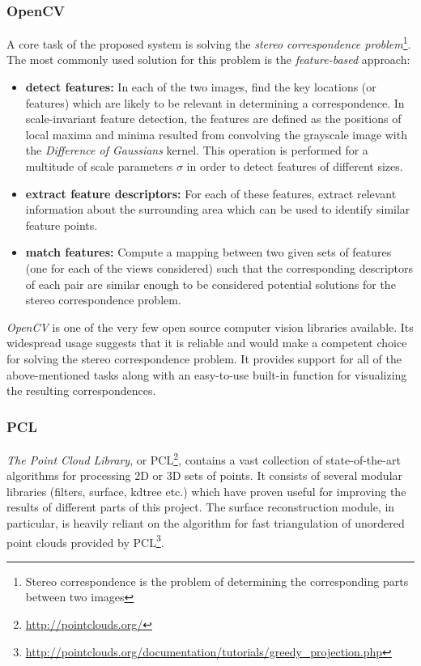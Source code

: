 \documentclass[12pt,a4paper,twoside,openright]{report}
\begin{document}
\subsubsection{OpenCV}
A core task of the proposed system is solving the \emph{stereo correspondence problem}\footnote{Stereo correspondence is the problem of determining the corresponding parts between two images}. The most commonly used solution for this problem is the \emph{feature-based} approach:
\begin{itemize}
\item \textbf{detect features:} In each of the two images, find the key locations (or features) which are likely to be relevant in determining a correspondence. In scale-invariant feature detection, the features are defined as the positions of local maxima and minima resulted from convolving the grayscale image with the \emph{Difference of Gaussians} kernel. This operation is performed for a multitude of scale parameters $\sigma$ in order to detect features of different sizes.
\item \textbf{extract feature descriptors:} For each of these features, extract relevant information about the surrounding area which can be used to identify similar feature points.
\item \textbf{match features:} Compute a mapping between two given sets of features (one for each of the views considered) such that the corresponding descriptors of each pair are similar enough to be considered potential solutions for the stereo correspondence problem.
\end{itemize}

\emph{OpenCV} is one of the very few open source computer vision libraries available. Its widespread usage suggests that it is reliable and would make a competent choice for solving the stereo correspondence problem. It provides support for all of the above-mentioned tasks along with an easy-to-use built-in function for visualizing the resulting correspondences.

\subsubsection{PCL}
\emph{The Point Cloud Library}, or PCL\footnote{\url{http://pointclouds.org/}}, contains a vast collection of state-of-the-art algorithms for processing 2D or 3D sets of points. It consists of several modular libraries (filters, surface, kdtree etc.) which have proven useful for improving the results of different parts of this project. The surface reconstruction module, in particular, is heavily reliant on the algorithm for fast triangulation of unordered point clouds\cite{Marton09ICRA} provided by PCL\footnote{\url{http://pointclouds.org/documentation/tutorials/greedy_projection.php}}.
\end{document}
